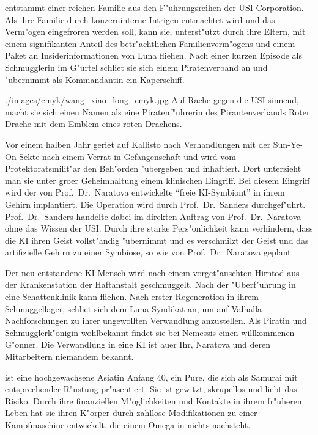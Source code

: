 \newpage
{}

\xls{} entstammt einer reichen Familie aus den F"uhrungsreihen der USI Corporation. Als ihre Familie durch konzerninterne Intrigen entmachtet wird und das Verm"ogen eingefroren werden soll, kann sie, unterst"utzt durch ihre Eltern, mit einem signifikanten Anteil des betr"achtlichen Familienverm"ogens und einem Paket an Insiderinformationen von Luna fliehen. Nach einer kurzen Episode als Schmugglerin im G"urtel schlie\3t sie sich einem Piratenverband an und "ubernimmt als Kommandantin ein Kaperschiff. 

\begin{sideimagebox}[r]{0.64}{./images/cmyk/wang_xiao_long_cmyk.jpg}{}
    Auf Rache gegen die USI sinnend, macht sie sich einen Namen als eine Piratenf"uhrerin des Pirantenverbands Roter Drache mit dem Emblem eines roten Drachens.

    Vor einem halben Jahr geriet \xl{} auf Kallisto nach Verhandlungen mit der Sun-Ye-On-Sekte nach einem Verrat in Gefangenschaft und wird vom Protektoratsmilit"ar den Beh"orden "ubergeben und inhaftiert. Dort unterzieht man sie unter gro\3er Geheimhaltung einem klinischen Eingriff. Bei diesem Eingriff wird der von Prof.~Dr.~Naratova entwickelte ``freie KI-Symbiont'' in ihrem Gehirn implantiert. Die Operation wird durch Prof.~Dr.~Sanders durchgef"uhrt. Prof.~Dr.~Sanders handelte dabei im direkten Auftrag von Prof.~Dr.~Naratova ohne das Wissen der USI. Durch ihre starke Pers"onlichkeit kann \xl{} verhindern, dass die KI ihren Geist vollst"andig "ubernimmt und es verschmilzt der Geist und das artifizielle Gehirn zu einer Symbiose, so wie von Prof.~Dr.~Naratova geplant. 
\end{sideimagebox}

Der neu entstandene KI-Mensch wird nach einem vorget"auschten Hirntod aus der Krankenstation der Haftanstalt geschmuggelt. Nach der "Uberf"uhrung in eine Schattenklinik kann \xl{} fliehen. Nach erster Regeneration in ihrem Schmuggellager, schlie\3t sich \xl{} dem Luna-Syndikat an, um auf Valhalla Nachforschungen zu ihrer ungewollten Verwandlung anzustellen. Als Piratin und Schmugglerk"onigin wohlbekannt findet sie bei Nemessis einen willkommenen G"onner. Die Verwandlung in eine KI ist au\3er Ihr, Naratova und deren Mitarbeitern niemandem bekannt.

\xl{} ist eine hochgewachsene Asiatin Anfang 40, ein Pure, die sich als Samurai mit entsprechender R"ustung pr"asentiert. Sie ist gewitzt, skrupellos und liebt das Risiko. Durch ihre finanziellen M"oglichkeiten und Kontakte in ihrem fr"uheren Leben hat sie ihren K"orper durch zahllose Modifikationen zu einer Kampfmaschine entwickelt, die einem Omega in nichts nachsteht.

